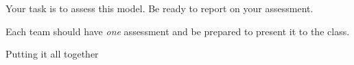 \hfill


Your task is to assess this model.
Be ready to report on your assessment.

\begin{teamwork}
Each team should have \emph{one} assessment and be prepared to present it to the class.	
\end{teamwork}



















\standardonlynewpage


%
%



\begin{module}{Putting it all together}
	\label{report}

	
	
\end{module}



%
%
%	
%
%







